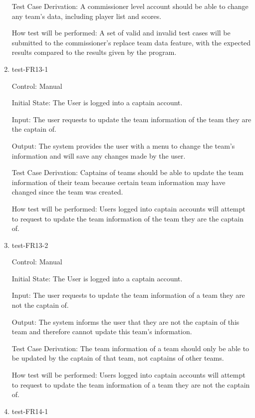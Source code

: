 \documentclass[12pt, titlepage]{article}
\begin{document}
\begin{enumerate}
  Test Case Derivation: A commissioner level account should be able to change
  any team's data, including player list and scores.

  How test will be performed: A set of valid and invalid test cases will be
  submitted to the commissioner's replace team data feature, with the expected
  results compared to the results given by the program.

  \item{test-FR13-1\\}

  Control: Manual

  Initial State: The User is logged into a captain account.

  Input: The user requests to update the team information of the team they are
  the captain of.

  Output: The system provides the user with a menu to change the team's
  information and will save any changes made by the user.

  Test Case Derivation: Captains of teams should be able to update the team
  information of their team because certain team information may have changed
  since the team was created.

  How test will be performed: Users logged into captain accounts will attempt
  to request to update the team information of the team they are the captain of.

  \item{test-FR13-2\\}

  Control: Manual

  Initial State: The User is logged into a captain account.

  Input: The user requests to update the team information of a team they are
  not the captain of.

  Output: The system informs the user that they are not the captain of this team
  and therefore cannot update this team's information.

  Test Case Derivation: The team information of a team should only be able to be
  updated by the captain of that team, not captains of other teams.

  How test will be performed: Users logged into captain accounts will attempt
  to request to update the team information of a team they are not the captain
  of.

  \item{test-FR14-1\\}


\end{enumerate}
\end{document}
